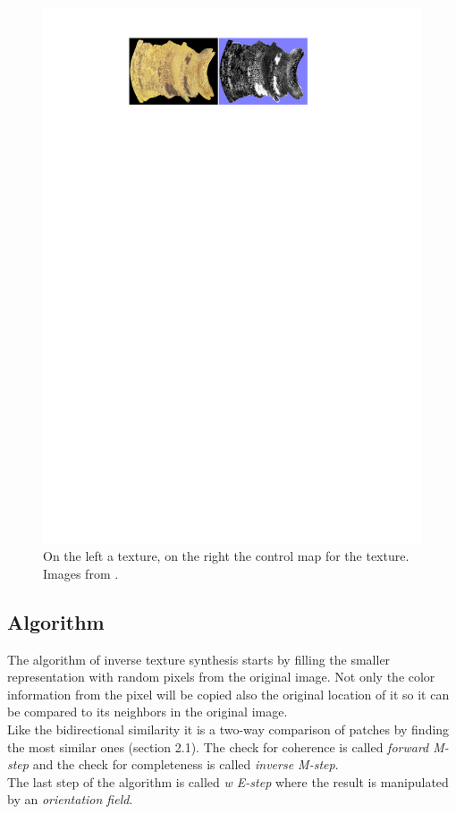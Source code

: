 \begin{figure}[h]
\centering
\includegraphics[scale=0.9]{img/controlmaps}
\caption[Control maps]{On the left a texture, on the right the control map for the texture.\\ Images from \cite{its}.}
\label{fig:Control maps}
\end{figure}


\subsection{Algorithm}
The algorithm of inverse texture synthesis starts by filling the smaller representation with random pixels from the original image. Not only the color information from the pixel will be copied also the original location of it so it can be compared to its neighbors in the original image.\\
Like the bidirectional similarity it is a two-way comparison of patches by finding the most similar ones (section 2.1). The check for coherence is called \textit{forward M-step} and the check for completeness is called \textit{inverse M-step}.\\
The last step of the algorithm is called \textit{w E-step} where the result is manipulated by an \textit{orientation field}.

